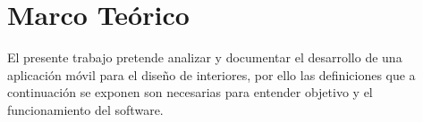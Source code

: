\chapter{Marco Teórico }
	El presente trabajo pretende analizar y documentar el desarrollo de una aplicación móvil para el diseño de interiores, por ello las definiciones que a continuación se exponen son necesarias para entender objetivo y el funcionamiento del software.
	
